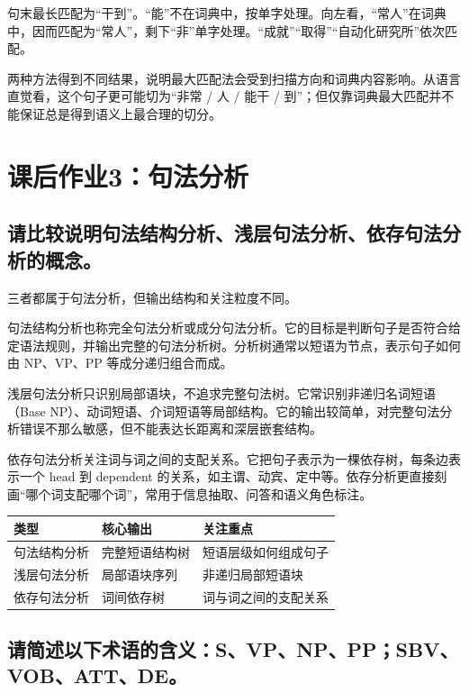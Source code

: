 句末最长匹配为“干到”。“能”不在词典中，按单字处理。向左看，“常人”在词典中，因而匹配为“常人”，剩下“非”单字处理。“成就”“取得”“自动化研究所”依次匹配。

两种方法得到不同结果，说明最大匹配法会受到扫描方向和词典内容影响。从语言直觉看，这个句子更可能切为“非常 / 人 / 能干 / 到”；但仅靠词典最大匹配并不能保证总是得到语义上最合理的切分。

\section{课后作业3：句法分析}

\subsection{请比较说明句法结构分析、浅层句法分析、依存句法分析的概念。}

三者都属于句法分析，但输出结构和关注粒度不同。

句法结构分析也称完全句法分析或成分句法分析。它的目标是判断句子是否符合给定语法规则，并输出完整的句法分析树。分析树通常以短语为节点，表示句子如何由 NP、VP、PP 等成分递归组合而成。

浅层句法分析只识别局部语块，不追求完整句法树。它常识别非递归名词短语（Base NP）、动词短语、介词短语等局部结构。它的输出较简单，对完整句法分析错误不那么敏感，但不能表达长距离和深层嵌套结构。

依存句法分析关注词与词之间的支配关系。它把句子表示为一棵依存树，每条边表示一个 head 到 dependent 的关系，如主谓、动宾、定中等。依存分析更直接刻画“哪个词支配哪个词”，常用于信息抽取、问答和语义角色标注。

\begin{table}[H]
\centering
\small
\begin{tabular}{|l|l|l|}
\hline
类型 & 核心输出 & 关注重点 \\ \hline
句法结构分析 & 完整短语结构树 & 短语层级如何组成句子 \\ \hline
浅层句法分析 & 局部语块序列 & 非递归局部短语块 \\ \hline
依存句法分析 & 词间依存树 & 词与词之间的支配关系 \\ \hline
\end{tabular}
\end{table}

\subsection{请简述以下术语的含义：S、VP、NP、PP；SBV、VOB、ATT、DE。}

